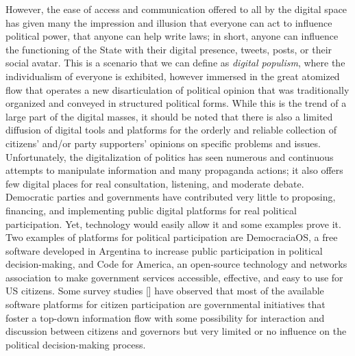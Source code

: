 However, the ease of access and communication offered to all by the digital space has given many the impression and illusion that everyone can act to influence political power, that anyone can help write laws; in short, anyone can influence the functioning of the State with their digital presence, tweets, posts, or their social avatar. This is a scenario that we can define as \textit{digital populism}, where the individualism of everyone is exhibited, however immersed in the great atomized flow that operates a new disarticulation of political opinion that was traditionally organized and conveyed in structured political forms. While this is the trend of a large part of the digital masses, it should be noted that there is also a limited diffusion of digital tools and platforms for the orderly and reliable collection of citizens' and/or party supporters' opinions on specific problems and issues. Unfortunately, the digitalization of politics has seen numerous and continuous attempts to manipulate information and many propaganda actions; it also offers few digital places for real consultation, listening, and moderate debate. Democratic parties and governments have contributed very little to proposing, financing, and implementing public digital platforms for real political participation. Yet, technology would easily allow it and some examples prove it. Two examples of platforms for political participation are DemocraciaOS, a free software developed in Argentina to increase public participation in political decision-making, and Code for America, an open-source technology and networks association to make government services accessible, effective, and easy to use for US citizens. Some survey studies [\citealt{chap:8:SantiniandCarvalho:2019}] have observed that most of the available software platforms for citizen participation are governmental initiatives that foster a top-down information flow with some possibility for interaction and discussion between citizens and governors but very limited or no influence on the political decision-making\vadjust{\vspace*{-18pt}\pagebreak} process.

